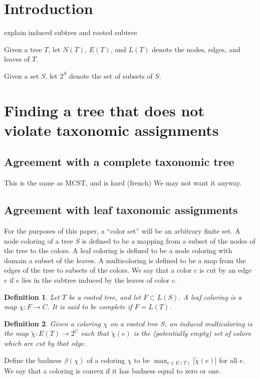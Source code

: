 \documentclass{amsart}
\newcommand{\col}{\chi}
\newcommand{\colt}{\tilde{\chi}}
\newcommand{\bad}{\beta}
\newtheorem{defn}{Definition}
\begin{document}
\section{Introduction}

explain induced subtree and rooted subtree

Given a tree $T$, let $N(T)$, $E(T)$, and $L(T)$ denote the nodes, edges, and leaves of $T$.

Given a set $S$, let $2^S$ denote the set of subsets of $S$.

\section{Finding a tree that does not violate taxonomic assignments}

\subsection{Agreement with a complete taxonomic tree}
This is the same as MCST, and is hard (french)
We may not want it anyway.

\subsection{Agreement with leaf taxonomic assignments}

For the purposes of this paper, a ``color set'' will be an arbitrary finite set.
A node coloring of a tree $S$ is defined to be a mapping from a subset of the nodes of the tree to the colors.
A leaf coloring is defined to be a node coloring with domain a subset of the leaves.
A multicoloring is defined to be a map from the edges of the tree to subsets of the colors.
We say that a color $c$ is cut by an edge $e$ if $e$ lies in the subtree induced by the leaves of color $c$.

\begin{defn}
  Let $T$ be a rooted tree, and let $F \subset L(S)$.
  A leaf coloring is a map $\col: F \rightarrow C$.
  It is said to be complete if $F = L(T)$.
\end{defn}

\begin{defn}
  Given a coloring $\col$ on a rooted tree $S$, an induced multicoloring is the map $\colt: E(T) \rightarrow 2^C$
  such that $\colt(e)$ is the (potentially empty) set of colors which are cut by that edge.
\end{defn}

Define the badness $\bad(\col)$ of a coloring $\col$ to be $\max_{e \in E(T)} |\colt(e)| $ for all $e$.
We say that a coloring is convex if it has badness equal to zero or one.
\end{document}
